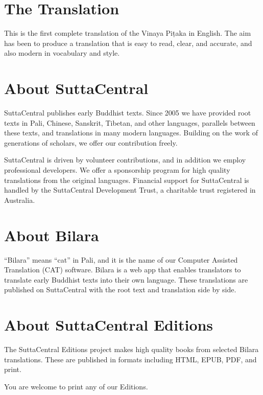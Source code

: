 \documentclass[12pt,openany]{book}%
\begin{document}
\section*{The Translation}

This is the first complete translation of the Vinaya \textsanskrit{Piṭaka} in English. The aim has been to produce a translation that is easy to read, clear, and accurate, and also modern in vocabulary and style.

\section*{About SuttaCentral}

SuttaCentral publishes early Buddhist texts. Since 2005 we have provided root texts in Pali, Chinese, Sanskrit, Tibetan, and other languages, parallels between these texts, and translations in many modern languages. Building on the work of generations of scholars, we offer our contribution freely.

SuttaCentral is driven by volunteer contributions, and in addition we employ professional developers. We offer a sponsorship program for high quality translations from the original languages. Financial support for SuttaCentral is handled by the SuttaCentral Development Trust, a charitable trust registered in Australia.

\section*{About Bilara}

“Bilara” means “cat” in Pali, and it is the name of our Computer Assisted Translation (CAT) software. Bilara is a web app that enables translators to translate early Buddhist texts into their own language. These translations are published on SuttaCentral with the root text and translation side by side.

\section*{About SuttaCentral Editions}

The SuttaCentral Editions project makes high quality books from selected Bilara translations. These are published in formats including HTML, EPUB, PDF, and print.

You are welcome to print any of our Editions.

%
\end{document}

